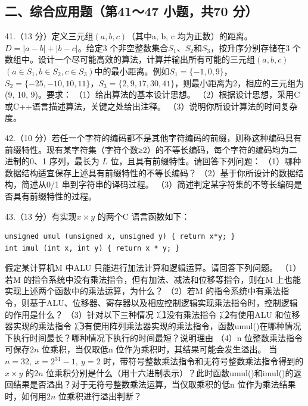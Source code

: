 \documentclass[UTF8,11pt]{ctexart}
\begin{document}
\subsection*{二、综合应用题（第41～47 小题，共70 分）}

41.（13 分）定义三元组\(\displaystyle (a,\allowbreak b,\allowbreak c)\)（其中a, b, c 均为正数）的距离。\(\displaystyle D=|a-b|+|b-c|\)。给定3 个非空整数集合\(\displaystyle S_1\)、\(\displaystyle S_2\)和\(\displaystyle S_3\)，按升序分别存储在3 个数组中。设计一个尽可能高效的算法，计算并输出所有可能的三元组\(\displaystyle (a,\allowbreak b,\allowbreak c)\)\(\displaystyle (a\in S_1,\allowbreak b\in S_2,\allowbreak c\in S_3)\)中的最小距离。例如\(\displaystyle S_1=\{-1,\allowbreak 0,\allowbreak 9\}\)，\(\displaystyle S_2=\{-25,\allowbreak -10,\allowbreak 10,\allowbreak 11\}\)，\(\displaystyle S_3=\{2,\allowbreak 9,\allowbreak 17,\allowbreak 30,\allowbreak 41\}\)，则最小距离为2，相应的三元组为(9, 10, 9)。要求： （1）给出算法的基本设计思想。 （2）根据设计思想，采用C 或C++语言描述算法，关键之处给出注释。 （3）说明你所设计算法的时间复杂度。


42.（10 分）若任一个字符的编码都不是其他字符编码的前缀，则称这种编码具有前缀特性。现有某字符集（字符个数≥2）的不等长编码，每个字符的编码均为二进制的0、1 序列，最长为 \(\displaystyle L\) 位，且具有前缀特性。请回答下列问题： （1）哪种数据结构适宜保存上述具有前缀特性的不等长编码？ （2）基于你所设计的数据结构，简述从0/1 串到字符串的译码过程。 （3）简述判定某字符集的不等长编码是否具有前缀特性的过程。


43.（13 分）有实现\(\displaystyle x\times y\) 的两个C 语言函数如下：


\begin{Verbatim}[breaklines,breakanywhere,fontsize=\small]
unsigned umul (unsigned x, unsigned y) { return x*y; }
int imul (int x, int y) { return x * y; }
\end{Verbatim}

假定某计算机M 中ALU 只能进行加法计算和逻辑运算。请回答下列问题。 （1）若M 的指令系统中没有乘法指令，但有加法、减法和位移等指令，则在M 上也能实现上述两个函数中的乘法运算，为什么？ （2）若M 的指令系统中有乘法指令，则基于ALU、位移器、寄存器以及相应控制逻辑实现乘法指令时，控制逻辑的作用是什么？ （3）针对以下三种情况：\textcircled{1}没有乘法指令；\textcircled{2}有使用ALU 和位移器实现的乘法指令；\textcircled{3}有使用阵列乘法器实现的乘法指令，函数umul()在哪种情况下执行时间最长？哪种情况下执行的时间最短？说明理由 （4）n 位整数乘法指令可保存\(\displaystyle 2n\) 位乘积，当仅取低n 位作为乘积时，其结果可能会发生溢出。 当\(\displaystyle n=32,\allowbreak \ x=2^{31}-1,\allowbreak \ y=2\) 时，带符号整数乘法指令和无符号整数乘法指令得到的\(\displaystyle x\times y\) 的\(\displaystyle 2n\) 位乘积分别是什么（用十六进制表示）？此时函数umul()和imul()的返回结果是否溢出？对于无符号整数乘法运算，当仅取乘积的低n 位作为乘法结果时，如何用\(\displaystyle 2n\) 位乘积进行溢出判断？
\end{document}
